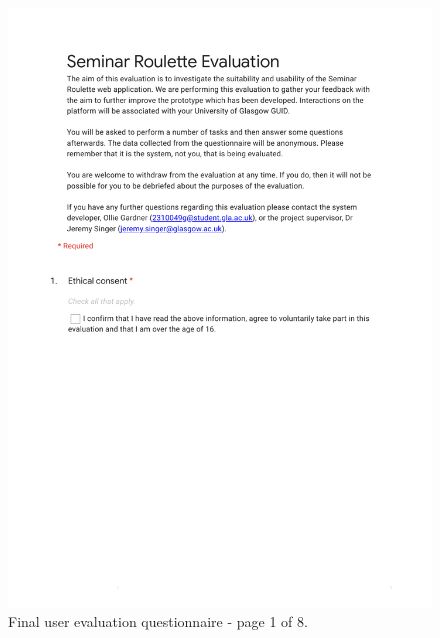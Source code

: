 \documentclass{l4proj}
\begin{document}
\begin{appendices}
\begin{figure}[htb]
    \centering
    \includegraphics[width=\linewidth]{images/final_evaluation_1.pdf}    
    \caption{Final user evaluation questionnaire - page 1 of 8.}
    \label{fig:final_evaluation_1} 
\end{figure}


\end{appendices}
\end{document}
